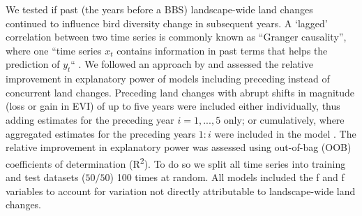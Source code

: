 We tested if past (\eg the years before a BBS) landscape-wide land changes continued to influence bird diversity change in subsequent years. A ‘lagged’ correlation between two time series is commonly known as “Granger causality”, where one “time series $x_t$ contains information in past terms that helps the prediction of $y_t$“ \citep{Granger1969}. We followed an approach by \cite{Papagiannopoulou2017} and assessed the relative improvement in explanatory power of models including preceding instead of concurrent land changes. Preceding land changes with abrupt shifts in magnitude (loss or gain in EVI) of up to five years were included either individually, thus adding estimates for the preceding year $i = 1,...,5$ only; or cumulatively, where aggregated estimates for the preceding years $1:i$ were included in the model \citep{Jung2018}. The relative improvement in explanatory power was assessed using out-of-bag (OOB) coefficients of determination (R\textsuperscript{2}). To do so we split all time series into training and test datasets ($50/50$) 100 times at random. All models included the f and f variables to account for variation not directly attributable to landscape-wide land changes.

